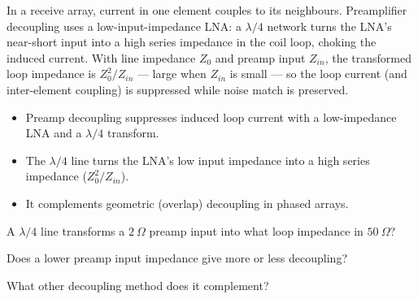 \begin{workedexample}
In a receive array, current in one element couples to its neighbours.
Preamplifier decoupling uses a low-input-impedance LNA: a $\lambda/4$ network turns
the LNA's near-short input into a high series impedance in the coil loop, choking
the induced current. With line impedance $Z_0$ and preamp input $Z_{in}$, the
transformed loop impedance is $Z_0^2/Z_{in}$ --- large when $Z_{in}$ is small --- so
the loop current (and inter-element coupling) is suppressed while noise match is
preserved.
\end{workedexample}

\begin{keytakeaways}
\begin{itemize}[leftmargin=1.4em,itemsep=2pt]
\item Preamp decoupling suppresses induced loop current with a low-impedance LNA and a $\lambda/4$ transform.
\item The $\lambda/4$ line turns the LNA's low input impedance into a high series impedance ($Z_0^2/Z_{in}$).
\item It complements geometric (overlap) decoupling in phased arrays.
\end{itemize}
\end{keytakeaways}

\begin{exercises}
\item A $\lambda/4$ line transforms a $2\ \Omega$ preamp input into what loop impedance in $50\ \Omega$?
\item Does a lower preamp input impedance give more or less decoupling?
\item What other decoupling method does it complement?
\end{exercises}

